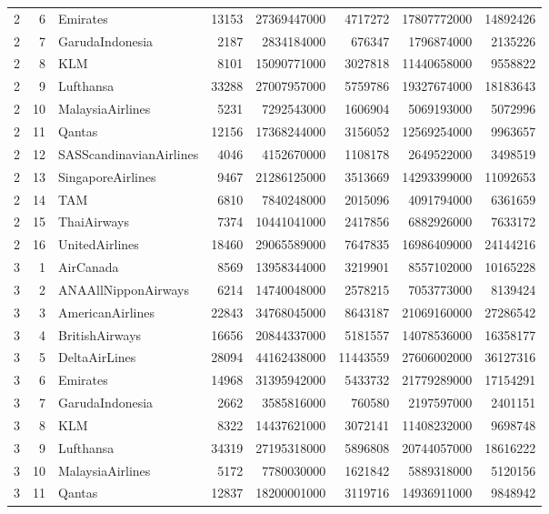 \begin{tabular}{rrlrrrrr}
2 & 6 & Emirates & 13153 & 27369447000 & 4717272 & 17807772000 & 14892426 \\
2 & 7 & GarudaIndonesia & 2187 & 2834184000 & 676347 & 1796874000 & 2135226 \\
2 & 8 & KLM & 8101 & 15090771000 & 3027818 & 11440658000 & 9558822 \\
2 & 9 & Lufthansa & 33288 & 27007957000 & 5759786 & 19327674000 & 18183643 \\
2 & 10 & MalaysiaAirlines & 5231 & 7292543000 & 1606904 & 5069193000 & 5072996 \\
2 & 11 & Qantas & 12156 & 17368244000 & 3156052 & 12569254000 & 9963657 \\
2 & 12 & SASScandinavianAirlines & 4046 & 4152670000 & 1108178 & 2649522000 & 3498519 \\
2 & 13 & SingaporeAirlines & 9467 & 21286125000 & 3513669 & 14293399000 & 11092653 \\
2 & 14 & TAM & 6810 & 7840248000 & 2015096 & 4091794000 & 6361659 \\
2 & 15 & ThaiAirways & 7374 & 10441041000 & 2417856 & 6882926000 & 7633172 \\
2 & 16 & UnitedAirlines & 18460 & 29065589000 & 7647835 & 16986409000 & 24144216 \\
3 & 1 & AirCanada & 8569 & 13958344000 & 3219901 & 8557102000 & 10165228 \\
3 & 2 & ANAAllNipponAirways & 6214 & 14740048000 & 2578215 & 7053773000 & 8139424 \\
3 & 3 & AmericanAirlines & 22843 & 34768045000 & 8643187 & 21069160000 & 27286542 \\
3 & 4 & BritishAirways & 16656 & 20844337000 & 5181557 & 14078536000 & 16358177 \\
3 & 5 & DeltaAirLines & 28094 & 44162438000 & 11443559 & 27606002000 & 36127316 \\
3 & 6 & Emirates & 14968 & 31395942000 & 5433732 & 21779289000 & 17154291 \\
3 & 7 & GarudaIndonesia & 2662 & 3585816000 & 760580 & 2197597000 & 2401151 \\
3 & 8 & KLM & 8322 & 14437621000 & 3072141 & 11408232000 & 9698748 \\
3 & 9 & Lufthansa & 34319 & 27195318000 & 5896808 & 20744057000 & 18616222 \\
3 & 10 & MalaysiaAirlines & 5172 & 7780030000 & 1621842 & 5889318000 & 5120156 \\
3 & 11 & Qantas & 12837 & 18200001000 & 3119716 & 14936911000 & 9848942 \\

\end{tabular}
